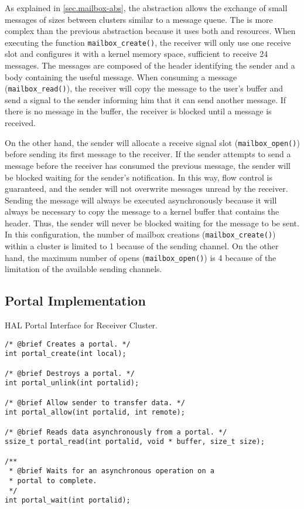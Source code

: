 				As explained in \autoref{sec.mailbox-abs}, the \mailbox abstraction
				allows the exchange of small messages of sizes between clusters similar
				to a \posix message queue.
				The \mailbox is more complex than the previous abstraction because it
				uses both \dnoc and \cnoc resources.
				When executing the function \texttt{mailbox\_create()}, the receiver
				will only use one \dnoc receive slot and configures it with a kernel
				memory space, sufficient to receive 24 messages.
				The messages are composed of the header identifying the sender
				and a body containing the useful message.
				When consuming a message (\texttt{mailbox\_read()}), the receiver
				will copy the message to the user's buffer and send a signal
				to the sender informing him that it can send another message.
				If there is no message in the buffer, the receiver is blocked
				until a message is received.

				On the other hand, the sender will allocate a receive signal slot (\texttt{mailbox\_open()})
				before sending its first message to the receiver.
				If the sender attempts to send a message before the receiver has consumed
				the previous message, the sender will be blocked waiting for the sender's notification.
				In this way, flow control is guaranteed, and the sender will not overwrite
				messages unread by the receiver.
				Sending the message will always be executed asynchronously
				because it will always be necessary to copy the message to
				a kernel buffer that contains the header.
				Thus, the sender will never be blocked waiting for the message to be sent.
				In this configuration, the number of mailbox creations (\texttt{mailbox\_create()})
				within a cluster is limited to 1 because of the \cnoc sending channel.
				On the other hand, the maximum number of opens (\texttt{mailbox\_open()}) is
				4 because of the limitation of the available \dnoc sending channels.


		\subsection*{Portal Implementation}


\begin{listing}[t]
\caption{HAL Portal Interface for Receiver Cluster.}
\label{code:portal-receiver}
\begin{verbatim}
/* @brief Creates a portal. */
int portal_create(int local);

/* @brief Destroys a portal. */
int portal_unlink(int portalid);

/* @brief Allow sender to transfer data. */
int portal_allow(int portalid, int remote);

/* @brief Reads data asynchronously from a portal. */
ssize_t portal_read(int portalid, void * buffer, size_t size);

/**
 * @brief Waits for an asynchronous operation on a
 * portal to complete.
 */
int portal_wait(int portalid);
\end{verbatim}
\end{listing}

